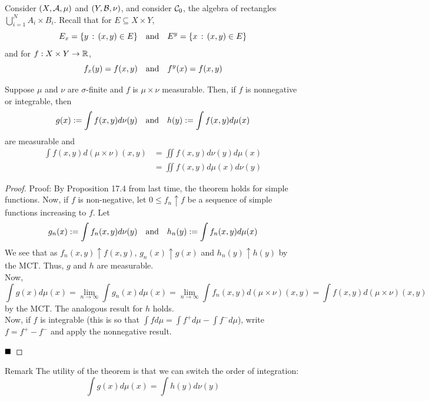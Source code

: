 
Consider $(X, \cal{A}, \mu)$ and $(Y, \cal{B}, \nu)$, and consider $\cal{C}_0$, the algebra of rectangles $\bigcup_{i = 1}^{N} A_i \times B_i$. Recall that for $E \subseteq X \times Y$,
\[ E_{x} = \{y \col (x, y) \in E\} \quand E^{y} = \{x \col (x, y) \in E\} \]
and for $f : X \times Y \to \R$,
\[ f_{x}(y) = f(x, y) \quand f^{y}(x) = f(x, y) \]

\begin{theorem}
    Suppose $\mu$ and $\nu$ are $\sigma$-finite and $f$ is $\mu \times \nu$ measurable. Then, if $f$ is nonnegative or integrable, then
    \[ g(x) := \int f(x, y) d\nu(y) \quand h(y) := \int f(x, y) d\mu(x) \]
    are measurable and
    \begin{align*}
        \int f(x, y) d(\mu \times \nu)(x, y) &= \iint f(x, y) d\nu(y) d\mu(x)\\
        &= \iint f(x, y) d\mu(x) d\nu(y)
    \end{align*}
\end{theorem}
\begin{proof}{Proof:}
    By Proposition 17.4 from last time, the theorem holds for simple functions. Now, if $f$ is non-negative, let $0 \leq f_n \uparrow f$ be a sequence of simple functions increasing to $f$. Let
    \[ g_n(x) := \int f_n(x, y) d\nu(y) \quand h_n(y) := \int f_n(x, y) d\mu(x) \]
    We see that as $f_n(x, y) \uparrow f(x, y)$, $g_n(x) \uparrow g(x)$ and $h_n(y) \uparrow h(y)$ by the MCT. Thus, $g$ and $h$ are measurable.\\

    Now,
    \[ \int g(x) d\mu(x) = \lim_{n \to \infty} \int g_n(x) d\mu(x) = \lim_{n \to \infty} \int f_n(x, y) d(\mu \times \nu)(x, y) = \int f(x, y) d(\mu \times \nu)(x, y) \]
    by the MCT. The analogous result for $h$ holds.\\

    Now, if $f$ is integrable (this is so that $\int f d\mu = \int f^{+} d\mu - \int f^{-} d\mu$), write $f = f^{+} - f^{-}$ and apply the nonnegative result. 

    $\qed$
\end{proof}

\begin{remark}{Remark}
    The utility of the theorem is that we can switch the order of integration:
    \[ \int g(x) d\mu(x) = \int h(y) d\nu(y) \]
\end{remark}

